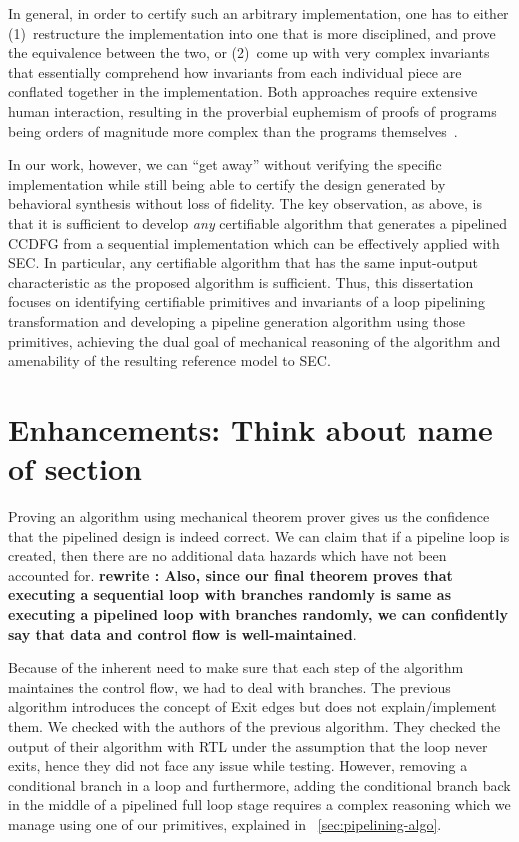 In general, in order to certify such an arbitrary implementation,
one has to either (1)~restructure the implementation into
one that is more disciplined, and prove the equivalence
between the two, or (2)~come up with very complex
invariants that essentially comprehend how invariants from
each individual piece are conflated together in the
implementation.  Both approaches require extensive human
interaction, resulting in the proverbial euphemism of proofs
of programs being orders of magnitude more complex than the
programs themselves~\cite{liu}.

In our work, however, we can ``get away'' without verifying
the specific implementation while still being able to
certify the design generated by behavioral synthesis without
loss of fidelity. The key observation, as above, is that it
is sufficient to develop {\em any} certifiable algorithm
that generates a pipelined CCDFG from a sequential
implementation which can be effectively applied with SEC.
In particular, any certifiable algorithm that has the same
input-output characteristic as the proposed algorithm
is sufficient.  Thus, this dissertation focuses on identifying
certifiable primitives and invariants of a loop pipelining
transformation and developing a pipeline generation
algorithm using those primitives, achieving the dual goal of
mechanical reasoning of the algorithm and amenability of the
resulting reference model to SEC.

\section{Enhancements: Think about name of section}

Proving an algorithm using mechanical theorem prover gives us the confidence that the pipelined design is indeed correct. We can claim that if a pipeline loop is created, then there are no additional data hazards which have not been accounted for. {\bf rewrite : Also, since our final theorem proves that executing a sequential loop with branches randomly is same as executing a pipelined loop with branches randomly, we can confidently say that data and control flow is well-maintained}.   

Because of the inherent need to make sure that each step of the algorithm maintaines the control flow, we had to deal with branches.  
The previous algorithm introduces the concept of Exit edges but does not explain/implement them. We checked with the authors of the previous algorithm. They checked the output of their algorithm with RTL under the assumption that the loop never exits, hence they did not face any issue while testing. However, removing a conditional branch in a loop and furthermore, adding the conditional branch back in the middle of a pipelined full loop stage requires a complex reasoning which we manage using one of our primitives, explained in ~\ref{sec:pipelining-algo}.


